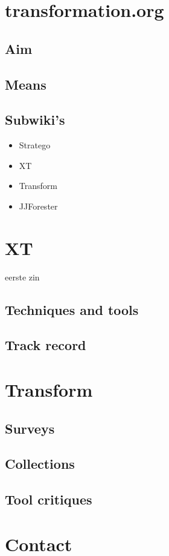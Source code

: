 \documentclass{atricle}
\begin{document}
\section{transformation.org}

\subsection{Aim}

\subsection{Means}

\subsection{Subwiki's}

\begin{itemize}
\item Stratego
\item XT
\item Transform
\item JJForester
\end{itemize}

\section{XT}

eerste zin

\subsection{Techniques and tools}
\subsection{Track record}

\section{Transform}

\subsection{Surveys}
\subsection{Collections}
\subsection{Tool critiques}

\section{Contact}
\end{document}
